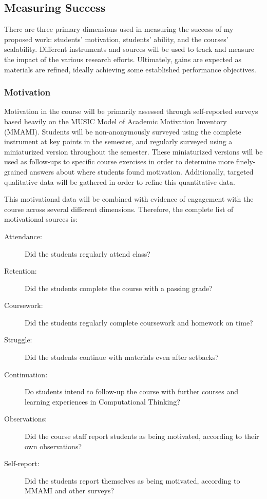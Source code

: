 \subsection{Measuring Success}

There are three primary dimensions used in measuring the success of my proposed work: students' motivation, students' ability, and the courses' scalability.
Different instruments and sources will be used to track and measure the impact of the various research efforts.
Ultimately, gains are expected as materials are refined, ideally achieving some established performance objectives.

\subsubsection{Motivation}
Motivation in the course will be primarily assessed through self-reported surveys based heavily on the MUSIC Model of Academic Motivation Inventory (MMAMI).
Students will be non-anonymously surveyed using the complete instrument at key points in the semester, and regularly surveyed using a miniaturized version throughout the semester.
These miniaturized versions will be used as follow-ups to specific course exercises in order to determine more finely-grained answers about where students found motivation.
Additionally, targeted qualitative data will be gathered in order to refine this quantitative data.

This motivational data will be combined with evidence of engagement with the course across several different dimensions. Therefore, the complete list of motivational sources is:
\begin{description}
	\item[Attendance:] Did the students regularly attend class?
	\item[Retention:] Did the students complete the course with a passing grade?
	\item[Coursework:] Did the students regularly complete coursework and homework on time?
	\item[Struggle:] Did the students continue with materials even after setbacks?
	\item[Continuation:] Do students intend to follow-up the course with further courses and learning experiences in Computational Thinking?
	\item[Observations:] Did the course staff report students as being motivated, according to their own observations?
	\item[Self-report:] Did the students report themselves as being motivated, according to MMAMI and other surveys?
\end{description}

